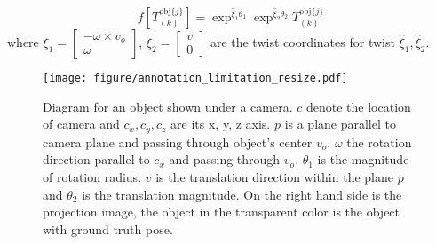 \begin{equation}
    f[T^{\text{obj}\{j\}}_{(k)}] = \exp^{\widehat{\xi}_1 \theta_1}  \exp^{\widehat{\xi}_2 \theta_2} T^{\text{obj}\{j\}}_{(k)}
    \label{eq:range}
\end{equation}
where ${\xi}_1 = \begin{bmatrix}-\omega \times v_o \\ \omega \end{bmatrix}$, ${\xi}_2 = \begin{bmatrix} v \\ 0 \end{bmatrix}$ are the twist coordinates for twist $\widehat{\xi}_1, \widehat{\xi}_2$.





 \begin{figure}[htbp]
     \centering
     \texttt{[image: figure/annotation\_limitation\_resize.pdf]}
     \caption{Diagram for an object shown under a camera. $c$ denote the location of camera and $c_x, c_y, c_z$ are its x, y, z axis. $p$ is a plane parallel to camera plane and passing through object's center $v_o$. $\omega$ the rotation direction parallel to $c_x$ and passing through $v_o$. $\theta_1$ is the magnitude of rotation radius. $v$ is the translation direction within the plane $p$ and $\theta_2$ is the translation magnitude. On the right hand side is the projection image, the object in the transparent color is the object with ground truth pose.}
     \label{fig:annotation_limitation}
 \end{figure}

